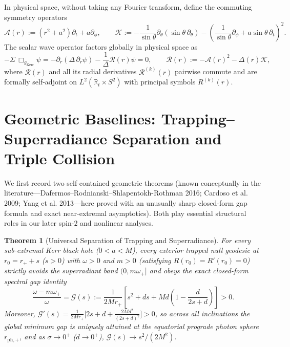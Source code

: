 \documentclass[11pt, a4paper]{article}
\newtheorem{theorem}{Theorem}[section]
\theoremstyle{remark}
\begin{document}
In physical space, without taking any Fourier transform, define the commuting symmetry operators
\begin{equation}
\label{eq:phys-ops}
\mathcal{A}(r) := (r^2 + a^2)\partial_t + a\partial_\phi, \qquad \mathcal{K} := -\frac{1}{\sin\theta}\partial_\theta(\sin\theta\,\partial_\theta) - \left(\frac{1}{\sin\theta}\partial_\phi + a\sin\theta\,\partial_t\right)^2.
\end{equation}
The scalar wave operator factors globally in physical space as
\begin{equation}
\label{eq:wave-op}
-\Sigma\,\Box_{g_{\mathrm{Kerr}}}\psi = -\partial_r(\Delta\,\partial_r\psi) - \frac{1}{\Delta}\mathcal{R}(r)\psi = 0, \qquad \mathcal{R}(r) := -\mathcal{A}(r)^2 - \Delta(r)\mathcal{K},
\end{equation}
where $\mathcal{R}(r)$ and all its radial derivatives $\mathcal{R}^{(k)}(r)$ pairwise commute and are formally self-adjoint on $L^2(\mathbb{R}_t \times S^2)$ with principal symbols $R^{(k)}(r)$.

\section{Geometric Baselines: Trapping--Superradiance Separation and Triple Collision}
\label{sec:baselines}

We first record two self-contained geometric theorems (known conceptually in the literature---Dafermos--Rodnianski--Shlapentokh-Rothman 2016; Cardoso et al. 2009; Yang et al. 2013---here proved with an unusually sharp closed-form gap formula and exact near-extremal asymptotics). Both play essential structural roles in our later spin-$2$ and nonlinear analyses.

\begin{theorem}[Universal Separation of Trapping and Superradiance]
\label{thm:separation}
For every sub-extremal Kerr black hole ($0 < a < M$), every exterior trapped null geodesic at $r_0 = r_+ + s$ ($s > 0$) with $\omega > 0$ and $m > 0$ (satisfying $R(r_0) = R'(r_0) = 0$) strictly avoids the superradiant band $(0, m\omega_+]$ and obeys the exact closed-form spectral gap identity
\begin{equation}
\label{eq:exact-gap}
\frac{\omega - m\omega_+}{\omega} = \mathcal{G}(s) := \frac{1}{2Mr_+}\left[s^2 + ds + Md\left(1 - \frac{d}{2s + d}\right)\right] > 0.
\end{equation}
Moreover, $\mathcal{G}'(s) = \frac{1}{2Mr_+}\big[2s + d + \frac{2Md^2}{(2s+d)^2}\big] > 0$, so across all inclinations the global minimum gap is uniquely attained at the equatorial prograde photon sphere $r_{\mathrm{ph},+}$, and as $\sigma \to 0^+$ ($d \to 0^+$), $\mathcal{G}(s) \to s^2/(2M^2)$.
\end{theorem}
\end{document}

